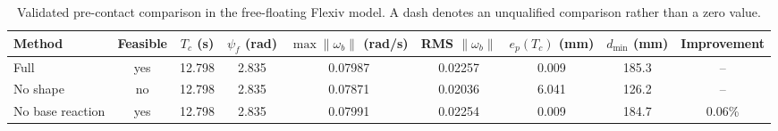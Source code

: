 \begin{table}[t]
\centering
\caption{Validated pre-contact comparison in the free-floating Flexiv model. A dash denotes an unqualified comparison rather than a zero value.}
\label{tab:precontact_comparison}
\begin{tabular}{lcccccccc}
\toprule
Method & Feasible & $T_c$ (s) & $\psi_f$ (rad) & $\max\|\omega_b\|$ (rad/s) & RMS $\|\omega_b\|$ & $e_p(T_c)$ (mm) & $d_{\min}$ (mm) & Improvement \\
\midrule
Full & yes & 12.798 & 2.835 & 0.07987 & 0.02257 & 0.009 & 185.3 & -- \\
No shape & no & 12.798 & 2.835 & 0.07871 & 0.02036 & 6.041 & 126.2 & -- \\
No base reaction & yes & 12.798 & 2.835 & 0.07991 & 0.02254 & 0.009 & 184.7 & 0.06\% \\
\bottomrule
\end{tabular}
\end{table}
